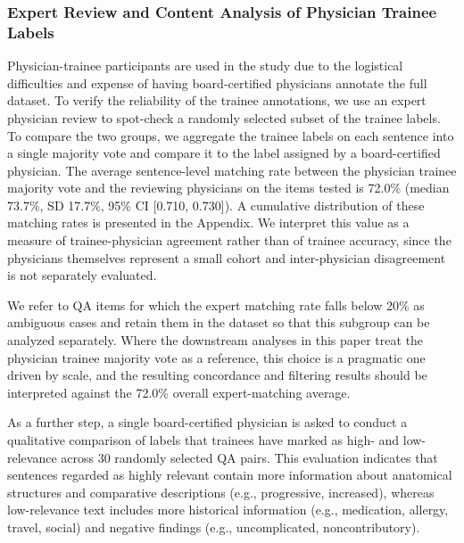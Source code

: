 \documentclass[fleqn,10pt]{wlscirep}
\begin{document}

\subsubsection{Expert Review and Content Analysis of Physician Trainee Labels}

Physician-trainee participants are used in the study due to the logistical difficulties and expense of having board-certified physicians annotate the full dataset. To verify the reliability of the trainee annotations, we use an expert physician review to spot-check a randomly selected subset of the trainee labels. To compare the two groups, we aggregate the trainee labels on each sentence into a single majority vote and compare it to the label assigned by a board-certified physician. The average sentence-level matching rate between the physician trainee majority vote and the reviewing physicians on the items tested is 72.0\% (median 73.7\%, SD 17.7\%, 95\% CI [0.710, 0.730]). A cumulative distribution of these matching rates is presented in the Appendix. We interpret this value as a measure of trainee-physician agreement rather than of trainee accuracy, since the physicians themselves represent a small cohort and inter-physician disagreement is not separately evaluated.

We refer to QA items for which the expert matching rate falls below 20\% as ambiguous cases and retain them in the dataset so that this subgroup can be analyzed separately. Where the downstream analyses in this paper treat the physician trainee majority vote as a reference, this choice is a pragmatic one driven by scale, and the resulting concordance and filtering results should be interpreted against the 72.0\% overall expert-matching average.


As a further step, a single board-certified physician is asked to conduct a qualitative comparison of labels that trainees have marked as high- and low-relevance across 30 randomly selected QA pairs. This evaluation indicates that sentences regarded as highly relevant contain more information about anatomical structures and comparative descriptions (e.g., progressive, increased), whereas low-relevance text includes more historical information (e.g., medication, allergy, travel, social) and negative findings (e.g., uncomplicated, noncontributory). %
\end{document}
